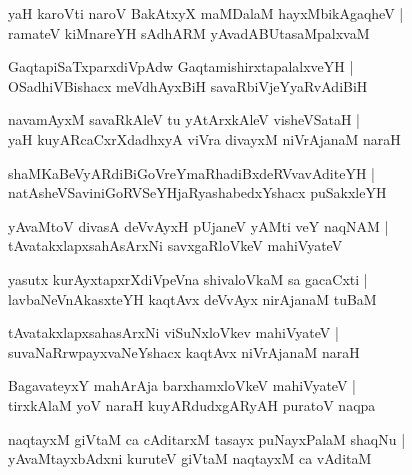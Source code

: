 \documentclass[twoside,12pt,openright]{book}
\newcounter{shloka}[chapter]
\begin{document}
\begin{shloka}%
yaH karoVti naroV BakAtxyX maMDalaM hayxMbikAgaqheV |\\
ramateV kiMnareYH sAdhARM yAvadABUtasaMpalxvaM 
\end{shloka}

\begin{shloka}%
GaqtapiSaTxparxdiVpAdw GaqtamishirxtapalalxveYH |\\
OSadhiVBishacx meVdhAyxBiH savaRbiVjeYyaRvAdiBiH 
\end{shloka}

\begin{shloka}%
navamAyxM savaRkAleV tu yAtArxkAleV visheVSataH |\\
yaH kuyARcaCxrXdadhxyA viVra divayxM niVrAjanaM naraH 
\end{shloka}

\begin{shloka}%
shaMKaBeVyARdiBiGoVreYmaRhadiBxdeRVvavAditeYH |\\
natAsheVSaviniGoRVSeYHjaRyashabedxYshacx puSakxleYH
\end{shloka}

\begin{shloka}%
yAvaMtoV divasA deVvAyxH pUjaneV yAMti veY naqNAM |\\
tAvatakxlapxsahAsArxNi savxgaRloVkeV mahiVyateV 
\end{shloka}

\begin{shloka}%
yasutx kurAyxtapxrXdiVpeVna shivaloVkaM sa gacaCxti |\\
lavbaNeVnAkasxteYH kaqtAvx deVvAyx nirAjanaM tuBaM 
\end{shloka}

\begin{shloka}%
tAvatakxlapxsahasArxNi viSuNxloVkev mahiVyateV |\\
suvaNaRrwpayxvaNeYshacx kaqtAvx niVrAjanaM naraH 
\end{shloka}

\begin{shloka}%
BagavateyxY mahArAja barxhamxloVkeV mahiVyateV |\\
tirxkAlaM yoV naraH kuyARdudxgARyAH puratoV naqpa 
\end{shloka}

\begin{shloka}%
naqtayxM giVtaM ca cAditarxM tasayx puNayxPalaM shaqNu |\\
yAvaMtayxbAdxni kuruteV giVtaM naqtayxM ca vAditaM 
\end{shloka}
\end{document}
